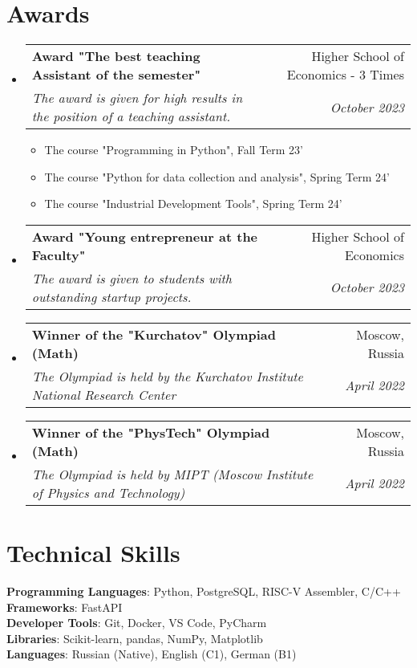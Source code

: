 \documentclass[letterpaper,11pt]{article}
\makeatletter
\newcommand{\resumeItem}[1]{
  \item\small{
    {#1 \vspace{-2pt}}
  }
}
\newcommand{\resumeSubheading}[4]{
  \vspace{-2pt}\item
    \begin{tabular*}{0.97\textwidth}[t]{l@{\extracolsep{\fill}}r}
      \textbf{#1} & #2 \\
      \textit{\small#3} & \textit{\small #4} \\
    \end{tabular*}\vspace{-7pt}
}
\newcommand{\resumeSubHeadingListStart}{\begin{itemize}[leftmargin=0.15in, label={}]}
\newcommand{\resumeSubHeadingListEnd}{\end{itemize}}
\newcommand{\resumeItemListStart}{\begin{itemize}}
\newcommand{\resumeItemListEnd}{\end{itemize}\vspace{-5pt}}
\makeatother
\begin{document}
\section{Awards}

  \resumeSubHeadingListStart
    \resumeSubheading
      {Award "The best teaching Assistant of the semester"}{Higher School of Economics - 3 Times}
      {The award is given for high results in the position of a teaching assistant.}{October 2023}
        \resumeItemListStart
            \resumeItem{The course "Programming in Python", Fall Term 23'}
            \resumeItem{The course "Python for data collection and analysis", Spring Term 24'}
            \resumeItem{The course "Industrial Development Tools", Spring Term 24'}
          \resumeItemListEnd

    \resumeSubheading
      {Award "Young entrepreneur at the Faculty"}{Higher School of Economics}
      {The award is given to students with outstanding startup projects.}{October 2023}

    \resumeSubheading
      {Winner of the "Kurchatov" Olympiad (Math)}{Moscow, Russia}
      {The Olympiad is held by the Kurchatov Institute National Research Center}{April 2022}

    \resumeSubheading
      {Winner of the "PhysTech" Olympiad (Math)}{Moscow, Russia}
      {The Olympiad is held by MIPT (Moscow Institute of Physics and Technology) }{April 2022}

  \resumeSubHeadingListEnd



%
\section{Technical Skills}
 \begin{itemize}[leftmargin=0.15in, label={}]
    \small{\item{
     \textbf{Programming Languages}{: Python, PostgreSQL, RISC-V Assembler, C/C++} \\
     \textbf{Frameworks}{: FastAPI} \\
     \textbf{Developer Tools}{: Git, Docker, VS Code, PyCharm} \\
     \textbf{Libraries}{: Scikit-learn, pandas, NumPy, Matplotlib} \\
     \textbf{Languages}{: Russian (Native), English (C1), German (B1)}
    }}
 \end{itemize}


\end{document}
